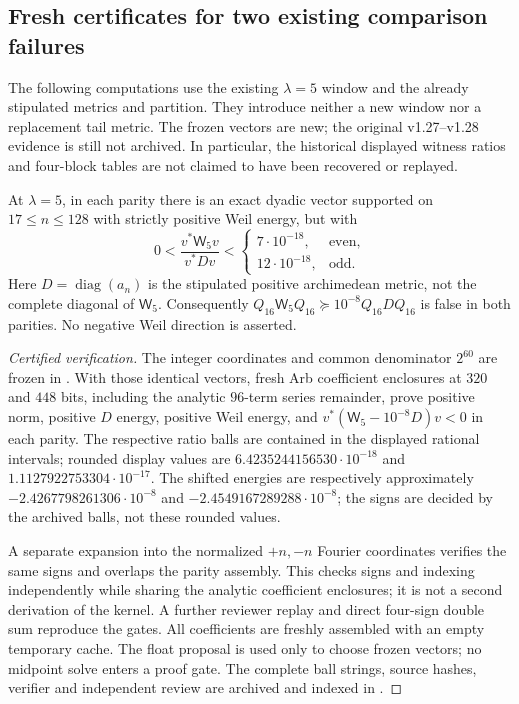 \subsection*{Fresh certificates for two existing comparison failures}

The following computations use the existing $\lambda=5$ window and
the already stipulated metrics and partition. They introduce neither a
new window nor a replacement tail metric. The frozen vectors are new;
the original v1.27--v1.28 evidence is still not archived. In particular,
the historical displayed witness ratios and four-block tables are not
claimed to have been recovered or replayed.

\begin{proposition}
\label{prop:v152-tail-comparison}
At $\lambda=5$, in each parity there is an exact dyadic vector supported
on $17\le n\le128$ with strictly positive Weil energy, but with
\[
 0<\frac{v^*\mathsf W_5v}{v^*Dv}
 <\begin{cases}7\cdot10^{-18},&\text{even},\\
               12\cdot10^{-18},&\text{odd}.
   \end{cases}
\]
Here $D=\operatorname{diag}(a_n)$ is the stipulated positive
archimedean metric, not the complete diagonal of $\mathsf W_5$.
Consequently $Q_{16}\mathsf W_5Q_{16}\succeq10^{-8}Q_{16}DQ_{16}$
is false in both parities. No negative Weil direction is asserted.
\end{proposition}
\begin{proof}[Certified verification]
The integer coordinates and common denominator $2^{60}$ are frozen in
. With those identical
vectors, fresh Arb coefficient enclosures at $320$ and $448$ bits,
including the analytic $96$-term series remainder, prove positive norm,
positive $D$ energy, positive Weil energy, and
$v^*(\mathsf W_5-10^{-8}D)v<0$ in each parity.
The respective ratio balls are contained in the displayed rational
intervals; rounded display values are
$6.4235244156530\cdot10^{-18}$ and
$1.1127922753304\cdot10^{-17}$.
The shifted energies are respectively approximately
$-2.4267798261306\cdot10^{-8}$ and
$-2.4549167289288\cdot10^{-8}$; the signs are decided by the
archived balls, not these rounded values.

A separate expansion into the normalized $+n,-n$ Fourier coordinates
verifies the same signs and overlaps the parity assembly. This checks
signs and indexing independently while sharing the analytic coefficient
enclosures; it is not a second derivation of the kernel. A further
reviewer replay and direct four-sign double sum reproduce the gates.
All coefficients are freshly assembled with an empty temporary cache.
The float proposal is used only to choose frozen vectors; no midpoint
solve enters a proof gate. The complete ball strings, source hashes,
verifier and independent review are archived and indexed in
.
\end{proof}

